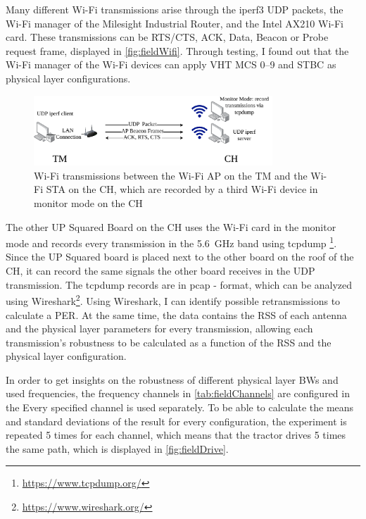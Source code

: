 Many different Wi-Fi transmissions arise through the iperf3 UDP packets, the Wi-Fi manager of the Milesight Industrial Router, and the Intel AX210 Wi-Fi card.
These transmissions can be RTS/CTS, ACK, Data, Beacon or Probe request frame, displayed in \autoref{fig:fieldWifi}.
Through testing, I found out that the Wi-Fi manager of the Wi-Fi devices can apply VHT \ac{MCS} \numrange{0}{9} and \ac{STBC} as physical layer configurations.

\begin{figure}[H]%
	\centering
	\includegraphics[width=0.8\textwidth]{figures/FieldExperimentwifi}
	\caption{Wi-Fi transmissions between the Wi-Fi \ac{AP} on the \acf{TM} and the Wi-Fi \ac{STA} on the \acf{CH}, which
	are recorded by a third Wi-Fi device in monitor mode on the \ac{CH}}
	\label{fig:fieldWifi}%
\end{figure}

The other UP Squared Board on the \ac{CH} uses the Wi-Fi card in the monitor mode and records every transmission in the \SI{5.6}{\giga\hertz} band using tcpdump \footnote{\url{https://www.tcpdump.org/}}.
Since the UP Squared board is placed next to the other board on the roof of the \ac{CH}, it can record the same signals the other board receives in the UDP transmission.
The tcpdump records are in pcap - format, which can be analyzed using Wireshark\footnote{\url{https://www.wireshark.org/}}.
Using Wireshark, I can identify possible retransmissions to calculate a \ac{PER}.
At the same time, the data contains the \ac{RSS} of each antenna and the physical layer parameters for every
transmission, allowing each transmission's robustness to be calculated as a function of the \ac{RSS} and the physical
layer configuration.

In order to get insights on the robustness of different physical layer \ac{BW}s and used frequencies, the frequency channels in \autoref{tab:fieldChannels} are configured in the
Every specified channel is used separately.
To be able to calculate the means and standard deviations of the result for every configuration, the experiment is repeated \num{5} times for each channel,
which means that the tractor drives \num{5} times the same path, which is displayed in \autoref{fig:fieldDrive}.

